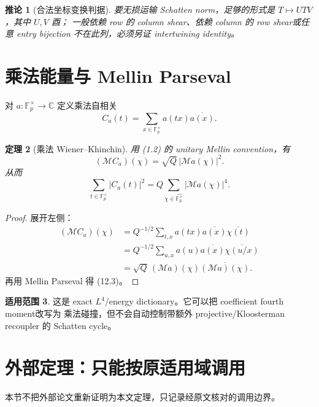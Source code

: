 \documentclass[11pt,a4paper]{ctexart}
\newtheorem{theorem}{定理}[section]
\newtheorem{corollary}[theorem]{推论}
\theoremstyle{definition}
\newtheorem{remark}[theorem]{适用范围}
\newcommand{\F}{\mathbb F}
\newcommand{\C}{\mathbb C}
\newcommand{\G}{\F_p^\times}
\newcommand{\Gh}{\widehat{\G}}
\newcommand{\1}{\mathbf 1}
\begin{document}
\begin{corollary}[合法坐标变换判据]
要无损运输 Schatten norm，足够的形式是 $T\mapsto UTV$，其中 $U,V$ 酉；
一般依赖 row 的 column shear、依赖 column 的 row shear或任意 entry bijection
不在此列，必须另证 intertwining identity。
\end{corollary}

\section{乘法能量与 Mellin Parseval}

对 $a:\G\to\C$ 定义乘法自相关
\[
C_a(t)=\sum_{x\in\G}a(tx)\overline{a(x)}.
\tag{12.1}
\]

\begin{theorem}[乘法 Wiener--Khinchin]
用 (1.2) 的 unitary Mellin convention，有
\[
\boxed{
(\mathcal M C_a)(\chi)=\sqrt Q\,|\mathcal Ma(\chi)|^2.}
\tag{12.2}
\]
从而
\[
\boxed{
\sum_{t\in\G}|C_a(t)|^2
=Q\sum_{\chi\in\Gh}|\mathcal Ma(\chi)|^4.}
\tag{12.3}
\]
\end{theorem}

\begin{proof}
展开左侧：
\begin{align*}
(\mathcal MC_a)(\chi)
&=Q^{-1/2}\sum_{t,x}a(tx)\overline{a(x)}\overline{\chi(t)}\\
&=Q^{-1/2}\sum_{u,x}a(u)\overline{a(x)}
\overline{\chi(u/x)}\\
&=\sqrt Q\,(\mathcal Ma)(\chi)\overline{(\mathcal Ma)(\chi)}.
\end{align*}
再用 Mellin Parseval 得 (12.3)。
\end{proof}

\begin{remark}
这是 exact $L^4$/energy dictionary。它可以把 coefficient fourth moment改写为
乘法碰撞，但不会自动控制带额外 projective/Kloosterman recoupler 的 Schatten cycle。
\end{remark}

\section{外部定理：只能按原适用域调用}

本节不把外部论文重新证明为本文定理，只记录经原文核对的调用边界。
\end{document}
